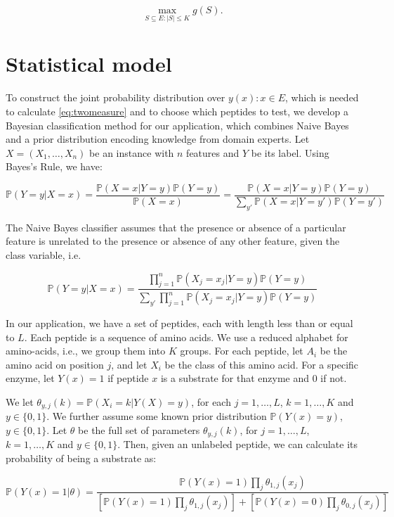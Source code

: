 \documentclass[12pt]{article}
\newcommand{\Prob}{\mathbb{P}}
\begin{document}
\begin{equation}
  \max_{S \subseteq E: |S| \leq K} g(S). 
  \label{eq:opt}
\end{equation}

\section{Statistical model} \label{sec:stat model}
To construct the joint probability distribution over $y(x): x \in E$, which is needed to calculate \eqref{eq:twomeasure} and to choose which peptides to test, we develop a Bayesian classification method for our application, which combines Naive Bayes and a prior distribution encoding knowledge from domain experts. Let $X=(X_1,\ldots,X_n)$ be an instance with $n$ features and $Y$ be its label. Using Bayes's Rule, we have:

\begin{equation*}
\Prob(Y=y|X=x)=\frac{\Prob(X=x|Y=y)\Prob(Y=y)}{\Prob(X=x)}=\frac{\Prob(X=x|Y=y)\Prob(Y=y)}{\sum_{y'}\Prob(X=x|Y=y')\Prob(Y=y')}
\end{equation*}

The Naive Bayes classifier assumes that the presence or absence of a particular feature is unrelated to the presence or absence of any other feature, given the class variable, i.e.

\begin{equation*}
\Prob(Y=y|X=x) = \frac{\prod_{j=1}^n\Prob(X_j=x_j|Y=y)\Prob(Y=y)}{\sum_{y'}\prod_{j=1}^n\Prob(X_j=x_j|Y=y)\Prob(Y=y)}
\end{equation*}

In our application, we have a set of peptides, each with length less than or equal to $L$. Each peptide is a sequence of amino acids. We use a reduced alphabet for amino-acids, i.e., we group them into $K$ groups. For each peptide, let $A_i$ be the amino acid on position $j$, and let $X_i$ be the class of this amino acid. For a specific enzyme, let $Y(x)=1$ if peptide $x$ is a substrate for that enzyme and 0 if not.

We let $\theta_{y,j}(k)=\Prob(X_i=k|Y(X)=y)$, for each $j=1,\ldots,L$, $k=1,\ldots,K$ and $y\in\{0,1\}$. We further assume some known prior distribution $\Prob(Y(x)=y)$, $y\in\{0,1\}$. Let $\theta$ be the full set of parameters $\theta_{y,j}(k)$, for $j=1,\ldots,L$, $k=1,\ldots,K$ and $y\in\{0,1\}$. Then, given an unlabeled peptide, we can calculate its probability of being a substrate as:

\begin{equation} \label{eq:model}
  \Prob\left(Y(x) = 1 | \theta\right) =
  \frac{\Prob(Y(x)=1) \prod_{j} \theta_{1,j}(x_j)}{
  \left[ \Prob(Y(x)=1) \prod_{j} \theta_{1,j}(x_j)\right] +
  \left[ \Prob(Y(x)=0) \prod_{j} \theta_{0,j}(x_j)\right]}
\end{equation}
\end{document}
